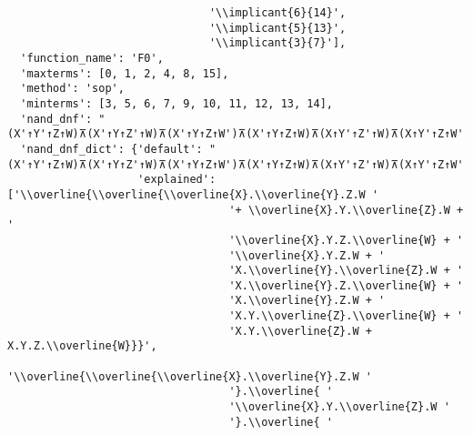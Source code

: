 \begin{verbatim}
                               '\\implicant{6}{14}',
                               '\\implicant{5}{13}',
                               '\\implicant{3}{7}'],
  'function_name': 'F0',
  'maxterms': [0, 1, 2, 4, 8, 15],
  'method': 'sop',
  'minterms': [3, 5, 6, 7, 9, 10, 11, 12, 13, 14],
  'nand_dnf': "(X'↑Y'↑Z↑W)⊼(X'↑Y↑Z'↑W)⊼(X'↑Y↑Z↑W')⊼(X'↑Y↑Z↑W)⊼(X↑Y'↑Z'↑W)⊼(X↑Y'↑Z↑W')⊼(X↑Y'↑Z↑W)⊼(X↑Y↑Z'↑W')⊼(X↑Y↑Z'↑W)⊼(X↑Y↑Z↑W')",
  'nand_dnf_dict': {'default': "(X'↑Y'↑Z↑W)⊼(X'↑Y↑Z'↑W)⊼(X'↑Y↑Z↑W')⊼(X'↑Y↑Z↑W)⊼(X↑Y'↑Z'↑W)⊼(X↑Y'↑Z↑W')⊼(X↑Y'↑Z↑W)⊼(X↑Y↑Z'↑W')⊼(X↑Y↑Z'↑W)⊼(X↑Y↑Z↑W')",
                    'explained': ['\\overline{\\overline{\\overline{X}.\\overline{Y}.Z.W '
                                  '+ \\overline{X}.Y.\\overline{Z}.W + '
                                  '\\overline{X}.Y.Z.\\overline{W} + '
                                  '\\overline{X}.Y.Z.W + '
                                  'X.\\overline{Y}.\\overline{Z}.W + '
                                  'X.\\overline{Y}.Z.\\overline{W} + '
                                  'X.\\overline{Y}.Z.W + '
                                  'X.Y.\\overline{Z}.\\overline{W} + '
                                  'X.Y.\\overline{Z}.W + X.Y.Z.\\overline{W}}}',
                                  '\\overline{\\overline{\\overline{X}.\\overline{Y}.Z.W '
                                  '}.\\overline{ '
                                  '\\overline{X}.Y.\\overline{Z}.W '
                                  '}.\\overline{ '

\end{verbatim}
